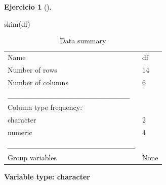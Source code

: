 \documentclass[
  a4paper,
]{scrreport}
\newenvironment{Shaded}{\begin{snugshade}}{\end{snugshade}}
\newcommand{\FunctionTok}[1]{\textcolor[rgb]{0.28,0.35,0.67}{#1}}
\newcommand{\NormalTok}[1]{\textcolor[rgb]{0.00,0.23,0.31}{#1}}
\theoremstyle{definition}
\newtheorem{exercise}{Ejercicio}[chapter]
\theoremstyle{remark}
\begin{document}
\begin{exercise}[]
\begin{enumerate}
\begin{tcolorbox}
\begin{Shaded}
\begin{Highlighting}[]
\FunctionTok{skim}\NormalTok{(df)}
\end{Highlighting}
\end{Shaded}

  \begin{longtable}[]{@{}ll@{}}
  \caption{Data summary}\tabularnewline
  \toprule\noalign{}
  \endfirsthead
  \endhead
  \bottomrule\noalign{}
  \endlastfoot
  Name & df \\
  Number of rows & 14 \\
  Number of columns & 6 \\
  \_\_\_\_\_\_\_\_\_\_\_\_\_\_\_\_\_\_\_\_\_\_\_ & \\
  Column type frequency: & \\
  character & 2 \\
  numeric & 4 \\
  \_\_\_\_\_\_\_\_\_\_\_\_\_\_\_\_\_\_\_\_\_\_\_\_ & \\
  Group variables & None \\
  \end{longtable}

  \textbf{Variable type: character}


\end{tcolorbox}
\end{enumerate}
\end{exercise}
\end{document}
